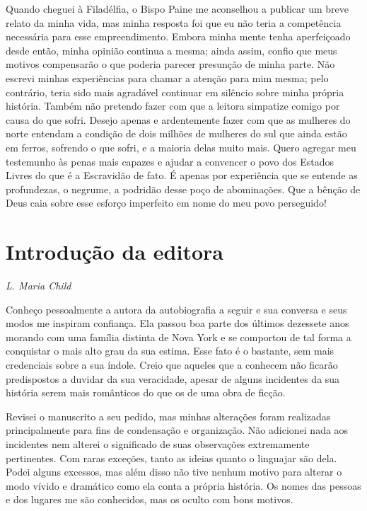 Quando cheguei à Filadélfia, o Bispo
Paine me aconselhou a publicar um breve relato da minha vida, mas minha
resposta foi que eu não teria a competência necessária para esse
empreendimento. Embora minha mente tenha aperfeiçoado desde então, minha
opinião continua a mesma; ainda assim, confio que meus motivos
compensarão o que poderia parecer presunção de minha parte. Não escrevi
minhas experiências para chamar a atenção para mim mesma; pelo
contrário, teria sido mais agradável continuar em silêncio sobre minha
própria história. Também não pretendo fazer com que a leitora simpatize
comigo por causa do que sofri. Desejo apenas e ardentemente fazer com
que as mulheres do norte entendam a condição de dois milhões de mulheres
do sul que ainda estão em ferros, sofrendo o que sofri, e a maioria
delas muito mais. Quero agregar meu testemunho às penas mais capazes e
ajudar a convencer o povo dos Estados Livres do que é a Escravidão de
fato. É apenas por experiência que se entende as profundezas, o negrume,
a podridão desse poço de abominações. Que a bênção de Deus caia sobre
esse esforço imperfeito em nome do meu povo perseguido!

\chapter{Introdução da editora}

\begin{flushright}
\emph{L. Maria Child}
\end{flushright}

Conheço pessoalmente a autora da
autobiografia a seguir e sua conversa e seus modos me inspiram
confiança. Ela passou boa parte
dos últimos dezessete anos morando com uma família distinta de Nova York
e se comportou de tal forma a conquistar o mais alto grau da sua estima.
Esse fato é o bastante, sem mais credenciais sobre a sua índole. Creio
que aqueles que a conhecem não ficarão predispostos a duvidar da sua
veracidade, apesar de alguns incidentes da sua história serem mais
românticos do que os de uma obra de ficção.

Revisei o manuscrito a seu pedido, mas
minhas alterações foram realizadas principalmente para fins de
condensação e organização. Não adicionei nada aos incidentes nem alterei
o significado de suas observações extremamente pertinentes. Com raras
exceções, tanto as ideias quanto o linguajar são dela. Podei alguns
excessos, mas além disso não tive nenhum motivo para alterar o modo
vívido e dramático como ela conta a própria história. Os nomes das
pessoas e dos lugares me são conhecidos, mas os oculto com bons motivos.

